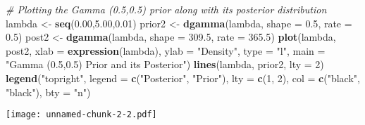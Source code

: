 \documentclass[]{article}
\newenvironment{Shaded}{\begin{snugshade}}{\end{snugshade}}
\newcommand{\AttributeTok}[1]{\textcolor[rgb]{0.13,0.29,0.53}{#1}}
\newcommand{\CommentTok}[1]{\textcolor[rgb]{0.56,0.35,0.01}{\textit{#1}}}
\newcommand{\DecValTok}[1]{\textcolor[rgb]{0.00,0.00,0.81}{#1}}
\newcommand{\FloatTok}[1]{\textcolor[rgb]{0.00,0.00,0.81}{#1}}
\newcommand{\FunctionTok}[1]{\textcolor[rgb]{0.13,0.29,0.53}{\textbf{#1}}}
\newcommand{\NormalTok}[1]{#1}
\newcommand{\OtherTok}[1]{\textcolor[rgb]{0.56,0.35,0.01}{#1}}
\newcommand{\StringTok}[1]{\textcolor[rgb]{0.31,0.60,0.02}{#1}}
\begin{document}
\begin{enumerate}
\begin{Shaded}
\begin{Highlighting}[]
\CommentTok{\# Plotting the Gamma (0.5,0.5) prior along with its posterior distribution}
\NormalTok{lambda }\OtherTok{\textless{}{-}} \FunctionTok{seq}\NormalTok{(}\FloatTok{0.00}\NormalTok{,}\FloatTok{5.00}\NormalTok{,}\FloatTok{0.01}\NormalTok{)}
\NormalTok{prior2 }\OtherTok{\textless{}{-}} \FunctionTok{dgamma}\NormalTok{(lambda, }\AttributeTok{shape =} \FloatTok{0.5}\NormalTok{, }\AttributeTok{rate =} \FloatTok{0.5}\NormalTok{)}
\NormalTok{post2 }\OtherTok{\textless{}{-}} \FunctionTok{dgamma}\NormalTok{(lambda, }\AttributeTok{shape =} \FloatTok{309.5}\NormalTok{, }\AttributeTok{rate =} \FloatTok{365.5}\NormalTok{)}
\FunctionTok{plot}\NormalTok{(lambda, post2, }\AttributeTok{xlab =} \FunctionTok{expression}\NormalTok{(lambda), }\AttributeTok{ylab =} \StringTok{"Density"}\NormalTok{, }
     \AttributeTok{type =} \StringTok{"l"}\NormalTok{, }\AttributeTok{main =} \StringTok{"Gamma (0.5,0.5) Prior and its Posterior"}\NormalTok{)}
\FunctionTok{lines}\NormalTok{(lambda, prior2, }\AttributeTok{lty =} \DecValTok{2}\NormalTok{)}
\FunctionTok{legend}\NormalTok{(}\StringTok{"topright"}\NormalTok{, }\AttributeTok{legend =} \FunctionTok{c}\NormalTok{(}\StringTok{"Posterior"}\NormalTok{, }\StringTok{"Prior"}\NormalTok{),  }
       \AttributeTok{lty =} \FunctionTok{c}\NormalTok{(}\DecValTok{1}\NormalTok{, }\DecValTok{2}\NormalTok{),  }
       \AttributeTok{col =} \FunctionTok{c}\NormalTok{(}\StringTok{"black"}\NormalTok{, }\StringTok{"black"}\NormalTok{),  }
       \AttributeTok{bty =} \StringTok{"n"}\NormalTok{) }
\end{Highlighting}
\end{Shaded}

\texttt{[image: unnamed-chunk-2-2.pdf]}


\end{enumerate}
\end{document}
